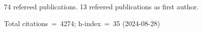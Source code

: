 74 refereed publications. 13 refeered publications as first author.

Total citations~=~4274; h-index~=~35 (2024-08-28)
